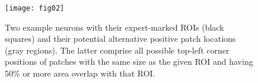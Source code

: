 
\begin{figure}[!t]
\centering
\texttt{[image: fig02]}
\caption{Two example neurons with their expert-marked ROIs (black squares) and their potential alternative positive patch locations (gray regions). The latter comprise all possible top-left corner positions of patches with the same size as the given ROI and having 50\% or more area overlap with that ROI.}
\label{fig:neuronROI}
\end{figure}

